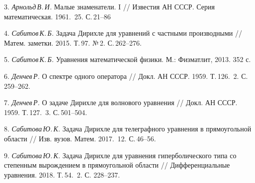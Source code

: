 3. {\it Арнольд\,В.\,И.}  Малые знаменатели. I // Известия АН СССР. Серия математическая. 1961. \No\,25. С.\,21--86

4. {\it Сабитов\,К.\,Б.} Задача Дирихле для уравнений с частными производными // Матем. заметки. 2015. Т.\,97. №\,2. С.\,262--276.

5. {\it Сабитов\,К.\,Б.} Уравнения математической физики. М.: Физматлит, 2013. 352 с.

6. {\it Денчев\,Р.} О спектре одного оператора // Докл. АН СССР. 1959. Т.\,126. \No\,2. С.\,259--262.

7. {\it Денчев\,Р.} О задаче Дирихле для волнового уравнения // Докл. АН СССР. 1959. Т.\,127. \No\,3. С.\,501--504.

8. {\it Сабитова\,Ю.\,К.} Задача Дирихле для телеграфного уравнения в прямоугольной области // Изв. вузов. Матем. 2017. \No\,12. С.\,46--56.

9. {\it Сабитова\,Ю.\,К.} Задача Дирихле для уравнения гиперболического типа со степенным вырождением в прямоугольной области // Дифференциальные уравнения. 2018. Т.\,54. \No\,2. С. 228--237.



